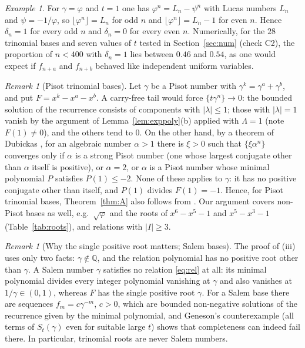 \documentclass[11pt]{amsart}
\theoremstyle{definition}
\theoremstyle{remark}
\newtheorem{remark}[lemma]{Remark}
\newtheorem{example}[lemma]{Example}
\newcommand{\Q}{\mathbb{Q}}
\newcommand{\fl}[1]{\lfloor #1\rfloor}
\newcommand{\fr}[1]{\{#1\}}
\begin{document}
\begin{example}
For $\gamma=\varphi$ and $t=1$ one has $\varphi^n=L_n-\psi^n$ with Lucas numbers $L_n$ and
$\psi=-1/\varphi$, so $\fl{\varphi^n}=L_n$ for odd $n$ and $\fl{\varphi^n}=L_n-1$ for even $n$.
Hence $\delta_n=1$ for every odd $n$ and $\delta_n=0$ for every even $n$. Numerically, for
the $28$ trinomial bases and seven values of $t$ tested in Section~\ref{sec:num} (check C2), the
proportion of $n<400$ with $\delta_n=1$ lies between $0.46$ and $0.54$, as one would expect if
$f_{n+a}$ and $f_{n+b}$ behaved like independent uniform variables.
\end{example}

\begin{remark}[Pisot trinomial bases]\label{rem:dub}
Let $\gamma$ be a Pisot number with $\gamma^k=\gamma^a+\gamma^b$, and put $F=x^k-x^a-x^b$. A
carry-free tail would force $\fr{t\gamma^n}\to0$: the bounded solution of the recurrence consists
of components with $|\lambda|\le1$; those with $|\lambda|=1$ vanish by the argument of
Lemma~\ref{lem:exppoly}(b) applied with $\Lambda=1$ (note $F(1)\ne0$), and the others tend to
$0$. On the other hand, by a theorem of Dubickas \cite[Theorem~4]{Dub06}, for an algebraic number
$\alpha>1$ there is $\xi>0$ such that $\fr{\xi\alpha^n}$ converges only if $\alpha$ is a strong Pisot
number (one whose largest conjugate other than $\alpha$ itself is positive), or $\alpha=2$, or
$\alpha$ is a Pisot number whose minimal polynomial $P$ satisfies $P(1)\le-2$. None of these
applies to $\gamma$: it has no positive conjugate other than itself, and $P(1)$ divides
$F(1)=-1$. Hence, for Pisot trinomial bases, Theorem~\ref{thm:A} also follows from
\cite{Dub06}. Our argument covers non-Pisot bases as well, e.g.\ $\sqrt\varphi$ and the roots of
$x^6-x^5-1$ and $x^5-x^3-1$ (Table~\ref{tab:roots}), and relations with $|I|\ge3$.
\end{remark}

\begin{remark}[Why the single positive root matters; Salem bases]\label{rem:salem}
The proof of (iii) uses only two facts: $\gamma\notin\Q$, and the relation polynomial has no
positive root other than $\gamma$. A Salem number $\gamma$ satisfies no relation
\eqref{eq:rel} at all: its minimal polynomial divides every integer polynomial vanishing at
$\gamma$ and also vanishes at $1/\gamma\in(0,1)$, whereas $F$ has the single positive root
$\gamma$. For a Salem base there are sequences $f_m=c\gamma^{-m}$, $c>0$, which are bounded
non-negative solutions of the recurrence given by the minimal polynomial, and Geneson's
counterexample \cite[Theorem~9]{Gen26} (all terms of $S_t(\gamma)$ even for suitable large
$t$) shows that completeness can indeed fail there. In particular, trinomial roots are never
Salem numbers.
\end{remark}
\end{document}
